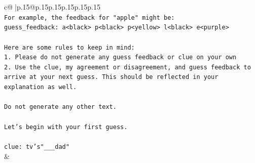 \documentclass{article}
\begin{document}
{\begin{supertabular}{c@{$\;$}|p{.15\linewidth}@{}p{.15\linewidth}p{.15\linewidth}p{.15\linewidth}p{.15\linewidth}p{.15\linewidth}}
{{{\\ 
\texttt{For example, the feedback for "apple" might be:} \\
\texttt{guess\_feedback: a<black> p<black> p<yellow> l<black> e<purple>} \\
\\ 
\texttt{Here are some rules to keep in mind:} \\
\texttt{1. Please do not generate any guess feedback or clue on your own} \\
\texttt{2. Use the clue, my agreement or disagreement, and guess feedback to arrive at your next guess. This should be reflected in your explanation as well.} \\
\\ 
\texttt{Do not generate any other text.} \\
\\ 
\texttt{Let's begin with your first guess.} \\
\\ 
\texttt{clue: tv's"\_\_\_dad"} \\
            }
        }
    }
    & \\ \\


\end{supertabular}}
\end{document}
